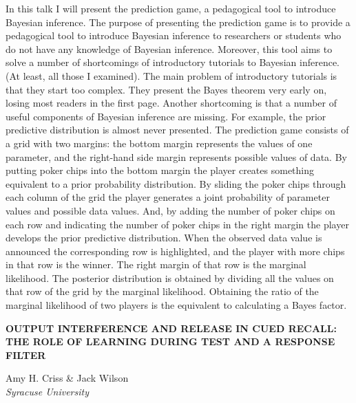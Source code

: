 \documentclass[]{article}
\begin{document}
In this talk I will present the prediction game, a pedagogical tool to
introduce Bayesian inference. The purpose of presenting the prediction
game is to provide a pedagogical tool to introduce Bayesian inference to
researchers or students who do not have any knowledge of Bayesian
inference. Moreover, this tool aims to solve a number of shortcomings of
introductory tutorials to Bayesian inference. (At least, all those I
examined). The main problem of introductory tutorials is that they start
too complex. They present the Bayes theorem very early on, losing most
readers in the first page. Another shortcoming is that a number of
useful components of Bayesian inference are missing. For example, the
prior predictive distribution is almost never presented. The prediction
game consists of a grid with two margins: the bottom margin represents
the values of one parameter, and the right-hand side margin represents
possible values of data. By putting poker chips into the bottom margin
the player creates something equivalent to a prior probability
distribution. By sliding the poker chips through each column of the grid
the player generates a joint probability of parameter values and
possible data values. And, by adding the number of poker chips on each
row and indicating the number of poker chips in the right margin the
player develops the prior predictive distribution. When the observed
data value is announced the corresponding row is highlighted, and the
player with more chips in that row is the winner. The right margin of
that row is the marginal likelihood. The posterior distribution is
obtained by dividing all the values on that row of the grid by the
marginal likelihood. Obtaining the ratio of the marginal likelihood of
two players is the equivalent to calculating a Bayes factor.\\
\pagebreak  

\textbf{OUTPUT INTERFERENCE AND RELEASE IN CUED RECALL: THE ROLE OF
LEARNING DURING TEST AND A RESPONSE FILTER}

Amy H. Criss \& Jack Wilson\\
\emph{Syracuse University}
\end{document}
